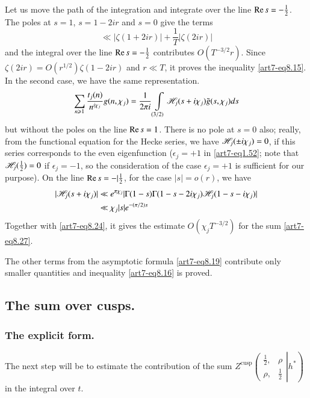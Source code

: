 Let us move the path of the integration and integrate over the line $\operatorname{Re} s = -\frac{1}{2}$. The poles at $s =1$, $s =1 -2ir$ and $s =0$ give the terms 
\begin{equation}
\ll |\zeta (1+ 2 ir )| + \frac{1}{T} |\zeta(2 ir)| \label{art7-eq8.26}
\end{equation}
and the integral over the line $\operatorname{Re} s = - \frac{1}{2}$ contributes $O(T^{-3/2} r)$. Since $\zeta(2 ir) = O(r^{1/2}) \zeta (1-2 ir)$ and $r \ll T$, it proves the inequality \eqref{art7-eq8.15}. In the second case, we have the same representation.
\begin{equation}
\sum\limits_{n \geqslant 1}  \frac{t_j(n)}{n^{i \chi_j}} g(n, \chi_j) =\frac{1}{2 \pi i} \int\limits_{(3/2)} \mathscr{H}_j (s+ i \chi_j) \tilde{g} (s,\chi_j) ds\label{art7-eq8.27}
\end{equation}
but without the poles on the line $\operatorname{Re} s =1$. There is no pole at $s =0$ also; really, from the functional equation for the Hecke series, we have $\mathscr{H}_j (\pm i \chi_j) =0$, if this series corresponds to the even eigenfunction  ($\epsilon_j =  +1$ in \eqref{art7-eq1.52}; note that $\mathscr{H}_j(\frac{1}{2}) =0$ if $\epsilon_j =-1$, so the consideration of the case $\epsilon_j = + 1$ is sufficient for our purpose). On the line $\operatorname{Re} s = - |\frac{1}{2}$, for the case $|s| = o (r)$, we have 
\begin{align}
|\mathscr{H}_j(s+ i\chi_j)| & \ll e^{\pi \chi_j} | \Gamma (1-s) \Gamma (1-s-2 i \chi_j) \mathscr{H}_j (1-s-i\chi_j) |\label{art7-eq8.28}\\
& \ll \chi_j |s| e^{-(\pi/2)s} \notag
\end{align}
Together with \eqref{art7-eq8.24}, it gives the estimate $O(\chi_j T^{-3/2})$ for the sum \eqref{art7-eq8.27}.

The other terms from the asymptotic formula \eqref{art7-eq8.19} contribute only smaller quantities and inequality \eqref{art7-eq8.16} is proved.

\setcounter{section}{2}
\subsection{The sum over cusps.}\label{art7-subsec2.8}

\subsubsection{The explicit form.}\label{art7-subsubsec2.8.1}

The next step will be to estimate the contribution of the sum $Z^{\text{cusp}} \left. \left(\begin{matrix}
\frac{1}{2}, & \rho\\
\rho, & \frac{1}{2}
\end{matrix}\right| h^\ast \right)$ in the integral over $t$.

